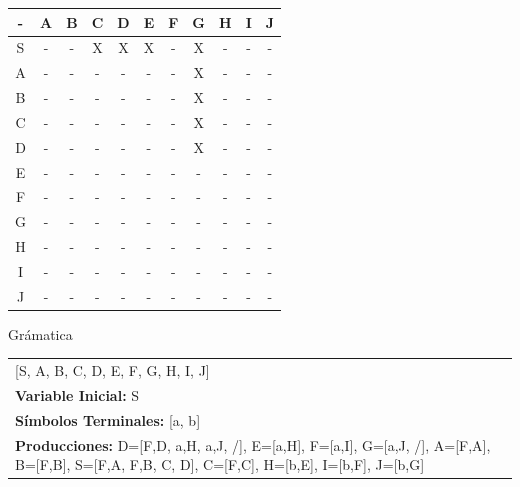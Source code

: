 \documentclass[a4paper,11pt]{article}
\newcommand{\MYp}[1]{ {\color[rgb]{0.392,0.392,0.392}#1} }
\begin{document}
\begin{center}
\begin{tabular}{||c||c||c||c||c||c||c||c||c||c||c||}
\hline
\hline
- & A & B & C & D & E & F & G & H & I & J \\
\hline
\hline
S & - & - & X & X & X & - & X & - & - & - \\
\hline
\hline
A & - & - & - & - & - & - & X & - & - & - \\
\hline
\hline
B & - & - & - & - & - & - & X & - & - & - \\
\hline
\hline
C & - & - & - & - & - & - & X & - & - & - \\
\hline
\hline
D & - & - & - & - & - & - & X & - & - & - \\
\hline
\hline
E & - & - & - & - & - & - & - & - & - & - \\
\hline
\hline
F & - & - & - & - & - & - & - & - & - & - \\
\hline
\hline
G & - & - & - & - & - & - & - & - & - & - \\
\hline
\hline
H & - & - & - & - & - & - & - & - & - & - \\
\hline
\hline
I & - & - & - & - & - & - & - & - & - & - \\
\hline
\hline
J & - & - & - & - & - & - & - & - & - & - \\
\hline
\hline
\end{tabular}
\end{center}

\MYp{\Huge Gr\'amatica}
\newline

\begin{center}\begin{tabular}{ m{15cm} }

\noindent {\bf Variables: }[S, A, B, C, D, E, F, G, H, I, J] \\
{\bf Variable Inicial: }S \\ 
{\bf S\'{i}mbolos Terminales: }[a, b] \\ 
{\bf Producciones: }{D=[F,D, a,H, a,J, /], E=[a,H], F=[a,I], G=[a,J, /], A=[F,A], B=[F,B], S=[F,A, F,B, C, D], C=[F,C], H=[b,E], I=[b,F], J=[b,G]} \\ 
\end{tabular}
\end{center}
\end{document}
